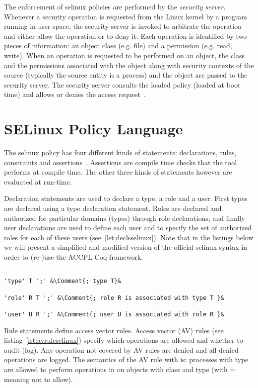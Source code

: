 The enforcement of \ac{selinux} policies are performed by the \emph{security server}. Whenever a security operation is requested from the Linux kernel by a program running in user space, the security server is invoked to arbitrate the operation and either allow the operation or to deny it. Each operation is identified by two pieces of information: an object class (e.g. file) and a permission (e.g. read, write). When an operation is requested to be performed on an object, the class and the permissions associated with the object along with security contexts of the source (typically the source entity is a process) and the object are passed to the security server. The security server consults the loaded policy (loaded at boot time) and allows or denies the access request~\cite{Sarna}.

\section{SELinux Policy Language}

The \ac{selinux} policy has four different kinds of statements: declarations, rules, constraints and assertions~\cite{ArcherLP03}. Assertions are compile time checks that the  tool performs at compile time. The other three kinds of statements however are evaluated at run-time. 

Declaration statements are used to declare a type, a role and a user. First types are declared using a type declaration statement. Roles are declared and authorized for particular domains (types) through role declarations, and finally user declarations are used to define each user and to specify the set of authorized roles for each of these users (see~\ref{lst:declsselinux}). Note that in the listings below we will present a simplified and modified version of the official \ac{selinux} syntax in order to (re-)use the \ac{ACCPL} Coq framework.

\lstset{language=selinux}
\begin{lstlisting}[frame=single, caption={Declarations},label={lst:declsselinux}]

'type' T ';' &\Comment{; type T}&

'role' R T ';' &\Comment{; role R is associated with type T }&

'user' U R ';' &\Comment{; user U is associated with role R }&

\end{lstlisting}

Rule statements define access vector rules. Access vector (AV) rules (see listing~\ref{lst:avruleselinux}) specify which operations are allowed and whether to audit (log). Any operation not covered by AV rules are denied and all denied operations are logged. The semantics of the AV rule with   is: processes with type  are allowed to perform operations in  on objects with class  and type  (with = meaning not to allow). 

